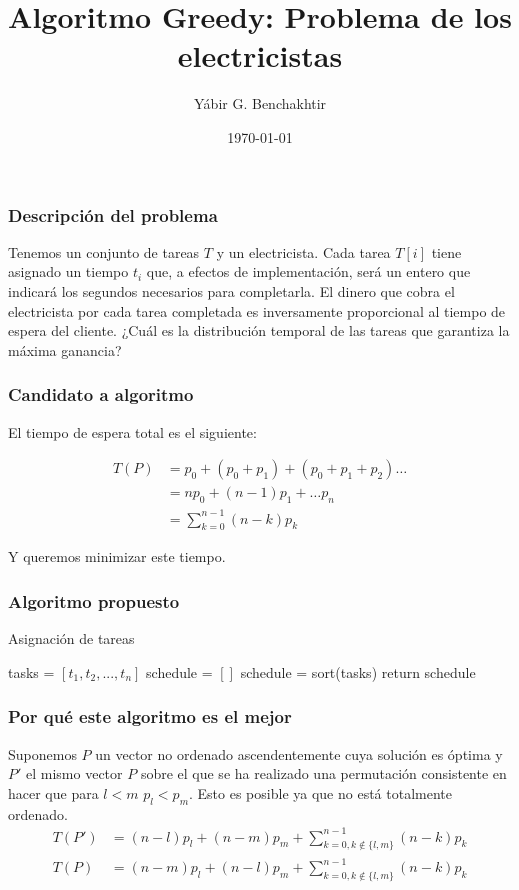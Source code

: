 \documentclass[spanish]{beamer}
\title{Algoritmo Greedy: Problema de los electricistas}
\date{\today}
\author{Yábir G. Benchakhtir}
\institute{Doble Grado en Ingeniería Informática y Matemáticas}
\begin{document}
\frame{\titlepage}

\begin{frame}\frametitle{Descripción del problema}
  Tenemos un conjunto de tareas $T$ y un electricista. Cada tarea $T[i]$
  tiene asignado un tiempo $t_i$ que, a efectos de implementación, será
  un entero que indicará los segundos necesarios para completarla. El
  dinero que cobra el electricista por cada tarea completada es
  inversamente proporcional al tiempo de espera del cliente. ¿Cuál es la
  distribución temporal de las tareas que garantiza la máxima ganancia?
\end{frame}

\begin{frame}\frametitle{Candidato a algoritmo}

  El tiempo de espera total es el siguiente:

  \begin{align}
      T(P) &= p_0 + (p_0 + p_1) + (p_0+ p_1 + p_2)  \dots \\
       &= np_0 + (n-1)p_1 + \dots p_n \\
       &= \sum_{k=0}^{n-1}(n-k)p_k
  \end{align}

  Y queremos minimizar este tiempo.
  
\end{frame}

\begin{frame}\frametitle{Algoritmo propuesto}

  \begin{algorithm}[H]
    \caption{Asignación de tareas}
    \begin{algorithmic}
      \State tasks = $[t_1, t_2, ... , t_n]$
      \State schedule = $[]$
      \State schedule = sort(tasks)
      \State return schedule
      \EndProcedure
    \end{algorithmic}
  \end{algorithm}
  
\end{frame}

\begin{frame}\frametitle{Por qué este algoritmo es el mejor}
  Suponemos $P$ un vector no ordenado ascendentemente cuya solución es
  óptima y $P'$ el mismo vector $P$ sobre el que se ha realizado una
  permutación consistente en hacer que para $ l < m$ $p_l < p_m$. Esto es posible ya que no está totalmente ordenado. 
  \begin{align*}
    T(P') &= (n-l)p_l + (n-m)p_m + \sum_{k=0, k \notin \{l,m\}}^{n-1}(n-k)p_k \\
    T(P) &= (n-m)p_l + (n-l)p_m + \sum_{k=0, k \notin \{l,m\}}^{n-1}(n-k)p_k
  \end{align*}
\end{frame}
\end{document}
